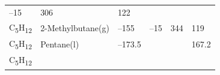 \documentclass[
  9pt,
]{extbook}
\theoremstyle{definition}
\theoremstyle{definition}
\theoremstyle{definition}
\theoremstyle{remark}
\begin{document}
\begin{longtable}[]{@{}llllll@{}}
\begin{minipage}[t]{0.15\columnwidth}
--15\strut
\end{minipage} & \begin{minipage}[t]{0.14\columnwidth}\raggedright
306\strut
\end{minipage} & \begin{minipage}[t]{0.14\columnwidth}\raggedright
122\strut
\end{minipage}\tabularnewline
\begin{minipage}[t]{0.07\columnwidth}\raggedright
C\textsubscript{5}H\textsubscript{12}\strut
\end{minipage} & \begin{minipage}[t]{0.17\columnwidth}\raggedright
2-Methylbutane(g)\strut
\end{minipage} & \begin{minipage}[t]{0.15\columnwidth}\raggedright
--155\strut
\end{minipage} & \begin{minipage}[t]{0.15\columnwidth}\raggedright
--15\strut
\end{minipage} & \begin{minipage}[t]{0.14\columnwidth}\raggedright
344\strut
\end{minipage} & \begin{minipage}[t]{0.14\columnwidth}\raggedright
119\strut
\end{minipage}\tabularnewline
\begin{minipage}[t]{0.07\columnwidth}\raggedright
C\textsubscript{5}H\textsubscript{12}\strut
\end{minipage} & \begin{minipage}[t]{0.17\columnwidth}\raggedright
Pentane(l)\strut
\end{minipage} & \begin{minipage}[t]{0.15\columnwidth}\raggedright
--173.5\strut
\end{minipage} & \begin{minipage}[t]{0.15\columnwidth}\raggedright
\strut
\end{minipage} & \begin{minipage}[t]{0.14\columnwidth}\raggedright
\strut
\end{minipage} & \begin{minipage}[t]{0.14\columnwidth}\raggedright
167.2\strut
\end{minipage}\tabularnewline
\begin{minipage}[t]{0.07\columnwidth}\raggedright
C\textsubscript{5}H\textsubscript{12}\strut
\end{minipage} & \begin{minipage}[t]{0.17\columnwidth}\raggedright

\end{minipage}
\end{longtable}
\end{document}
